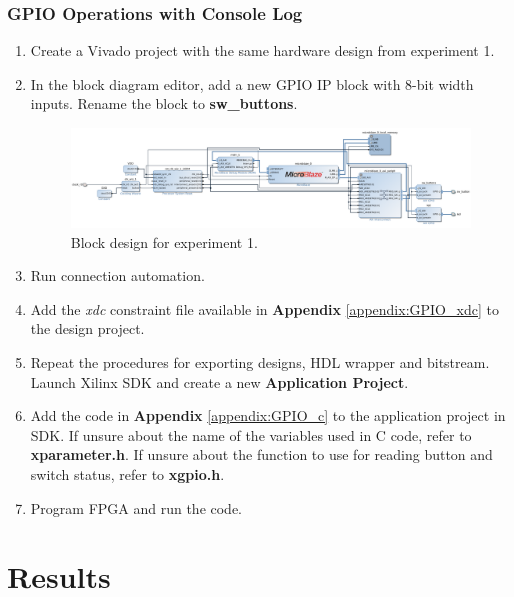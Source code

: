 \documentclass[11pt,letterpaper,titlepage]{article}
\begin{document}
\newpage

\section{GPIO Operations with Console Log}

\begin{enumerate}
    \item Create a Vivado project with the same hardware design from experiment 1.
    
    \item In the block diagram editor, add a new GPIO IP block with 8-bit width inputs. Rename the block to \textbf{sw\_buttons}.
    
    \begin{figure}[ht]
    \centering
    \includegraphics[width=\textwidth]{Ex2_layout.png}
    \caption{Block design for experiment 1.}
    \end{figure}
    
    \item Run connection automation.
    
    \item Add the \textit{xdc} constraint file available in \textbf{Appendix} \ref{appendix:GPIO_xdc} to the design project.
    
    \item Repeat the procedures for exporting designs, HDL wrapper and bitstream. Launch Xilinx SDK and create a new \textbf{Application Project}.
    
    \item Add the code in \textbf{Appendix} \ref{appendix:GPIO_c} to the application project in SDK. If unsure about the name of the variables used in C code, refer to \textbf{xparameter.h}. If unsure about the function to use for reading button and switch status, refer to \textbf{xgpio.h}.
    
    \item Program FPGA and run the code. 
    
\end{enumerate}

\newpage

\part{Results}
\end{document}

